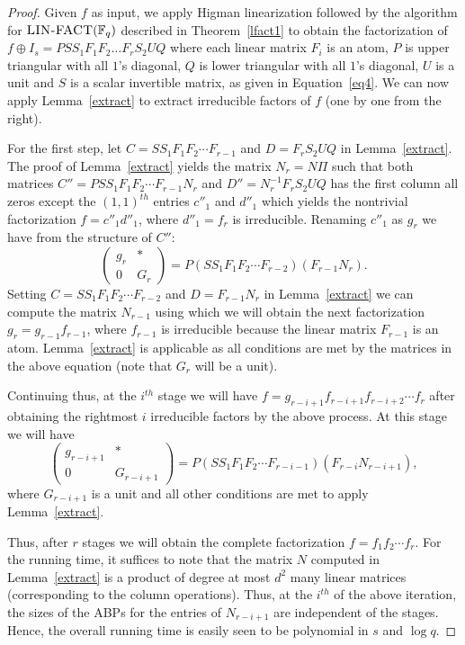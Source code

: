 \documentclass[10pt,a4paper]{article}
\newcommand{\F}{\mathbb{F}}
\newcommand{\prob}[1]{\textsc{#1}}
\begin{document}
\begin{proof}
  Given $f$ as input, we apply Higman linearization followed by the
  algorithm for $\prob{LIN{-}FACT}(\F_q)$ described in
  Theorem~\ref{lfact1} to obtain the factorization of $f\oplus I_s=PSS_1F_1F_2 \ldots F_rS_2UQ$ where 
each linear matrix $F_i$ is an atom, $P$ is upper triangular
with all $1$'s diagonal, $Q$ is lower triangular with all $1$'s
diagonal, $U$ is a unit and $S$ is a scalar invertible matrix, as given in Equation~\ref{eq4}. 
%
   We can now apply Lemma~\ref{extract} to
  extract irreducible factors of $f$ (one by one from the right).

  For the first step, let $C=S S_1F_1F_2\cdots F_{r-1}$ and $D=F_rS_2UQ$
  in Lemma~\ref{extract}. The proof of Lemma~\ref{extract} yields the
  matrix $N_r=N\Pi$ such that both matrices $C''=PS S_1F_1F_2\cdots
  F_{r-1}N_r$ and $D''=N_r^{-1}F_rS_2UQ$ has the first column all zeros
  except the $(1,1)^{th}$ entries $c''_1$ and $d''_1$ which yields the
  nontrivial factorization $f=c''_1d''_1$, where $d''_1=f_r$ is 
  irreducible. Renaming $c''_1$ as $g_r$ we have from the structure of
  $C''$:
  \[
  \left( \begin{array}{cc} g_r & * \\ 0 & G_r \end{array} \right) =
  P(SS_1F_1F_2\cdots F_{r-2}) (F_{r-1}N_r).
  \]
Setting $C= SS_1F_1F_2\cdots F_{r-2}$ and $D=F_{r-1}N_r$ in
Lemma~\ref{extract} we can compute the matrix $N_{r-1}$ using which we
will obtain the next factorization $g_r=g_{r-1}f_{r-1}$, where
$f_{r-1}$ is irreducible because the linear matrix $F_{r-1}$ is an
atom. Lemma~\ref{extract} is applicable as all conditions are met by
the matrices in the above equation (note that $G_r$ will be a unit).

Continuing thus, at the $i^{th}$ stage we will have
$f=g_{r-i+1}f_{r-i+1}f_{r-i+2}\cdots f_r$ after obtaining the
rightmost $i$ irreducible factors by the above process. At this stage
we will have
  \[
  \left( \begin{array}{cc} g_{r-i+1} & * \\ 0 & G_{r-i+1} \end{array}
  \right) = P(SS_1F_1F_2\cdots F_{r-i-1}) (F_{r-i}N_{r-i+1}),
  \]
  where $G_{r-i+1}$ is a unit and all other conditions are met to
  apply Lemma~\ref{extract}.

  Thus, after $r$ stages we will obtain the complete factorization
  $f=f_1f_2\cdots f_r$. For the running time, it suffices to note that
  the matrix $N$ computed in Lemma~\ref{extract} is a product of
  degree at most $d^2$ many linear matrices (corresponding to the
  column operations). Thus, at the $i^{th}$ of the above iteration,
  the sizes of the ABPs for the entries of $N_{r-i+1}$ are independent
  of the stages. Hence, the overall running time is easily seen to be
  polynomial in $s$ and $\log q$.
\end{proof}
\end{document}
